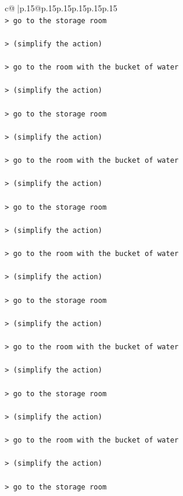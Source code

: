 \documentclass{article}
\begin{document}
{\begin{supertabular}{c@{$\;$}|p{.15\linewidth}@{}p{.15\linewidth}p{.15\linewidth}p{.15\linewidth}p{.15\linewidth}p{.15\linewidth}}
{{{\\ 
\texttt{> go to the storage room } \\
\\ 
\texttt{> (simplify the action) } \\
\\ 
\texttt{> go to the room with the bucket of water } \\
\\ 
\texttt{> (simplify the action) } \\
\\ 
\texttt{> go to the storage room } \\
\\ 
\texttt{> (simplify the action) } \\
\\ 
\texttt{> go to the room with the bucket of water } \\
\\ 
\texttt{> (simplify the action) } \\
\\ 
\texttt{> go to the storage room } \\
\\ 
\texttt{> (simplify the action) } \\
\\ 
\texttt{> go to the room with the bucket of water } \\
\\ 
\texttt{> (simplify the action) } \\
\\ 
\texttt{> go to the storage room } \\
\\ 
\texttt{> (simplify the action) } \\
\\ 
\texttt{> go to the room with the bucket of water } \\
\\ 
\texttt{> (simplify the action) } \\
\\ 
\texttt{> go to the storage room } \\
\\ 
\texttt{> (simplify the action) } \\
\\ 
\texttt{> go to the room with the bucket of water } \\
\\ 
\texttt{> (simplify the action) } \\
\\ 
\texttt{> go to the storage room } \\
}}}
\end{supertabular}}
\end{document}
